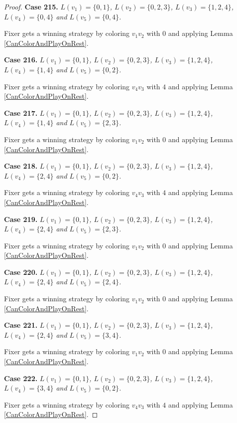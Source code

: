 \documentclass[12pt]{amsart}
\theoremstyle{plain}
\theoremstyle{definition}
\theoremstyle{remark}
\begin{document}
\begin{proof}
\noindent\textbf{Case 215.  }\textit{$L(v_1) = \{0, 1\}$, $L(v_2) = \{0, 2, 3\}$, $L(v_3) = \{1, 2, 4\}$, $L(v_4) = \{0, 4\}$ and $L(v_5) = \{0, 4\}$.}

Fixer gets a winning strategy by coloring $v_1v_2$ with $0$ and applying Lemma \ref{CanColorAndPlayOnRest}.

\noindent\textbf{Case 216.  }\textit{$L(v_1) = \{0, 1\}$, $L(v_2) = \{0, 2, 3\}$, $L(v_3) = \{1, 2, 4\}$, $L(v_4) = \{1, 4\}$ and $L(v_5) = \{0, 2\}$.}

Fixer gets a winning strategy by coloring $v_4v_3$ with $4$ and applying Lemma \ref{CanColorAndPlayOnRest}.

\noindent\textbf{Case 217.  }\textit{$L(v_1) = \{0, 1\}$, $L(v_2) = \{0, 2, 3\}$, $L(v_3) = \{1, 2, 4\}$, $L(v_4) = \{1, 4\}$ and $L(v_5) = \{2, 3\}$.}

Fixer gets a winning strategy by coloring $v_1v_2$ with $0$ and applying Lemma \ref{CanColorAndPlayOnRest}.

\noindent\textbf{Case 218.  }\textit{$L(v_1) = \{0, 1\}$, $L(v_2) = \{0, 2, 3\}$, $L(v_3) = \{1, 2, 4\}$, $L(v_4) = \{2, 4\}$ and $L(v_5) = \{0, 2\}$.}

Fixer gets a winning strategy by coloring $v_4v_3$ with $4$ and applying Lemma \ref{CanColorAndPlayOnRest}.

\noindent\textbf{Case 219.  }\textit{$L(v_1) = \{0, 1\}$, $L(v_2) = \{0, 2, 3\}$, $L(v_3) = \{1, 2, 4\}$, $L(v_4) = \{2, 4\}$ and $L(v_5) = \{2, 3\}$.}

Fixer gets a winning strategy by coloring $v_1v_2$ with $0$ and applying Lemma \ref{CanColorAndPlayOnRest}.

\noindent\textbf{Case 220.  }\textit{$L(v_1) = \{0, 1\}$, $L(v_2) = \{0, 2, 3\}$, $L(v_3) = \{1, 2, 4\}$, $L(v_4) = \{2, 4\}$ and $L(v_5) = \{2, 4\}$.}

Fixer gets a winning strategy by coloring $v_1v_2$ with $0$ and applying Lemma \ref{CanColorAndPlayOnRest}.

\noindent\textbf{Case 221.  }\textit{$L(v_1) = \{0, 1\}$, $L(v_2) = \{0, 2, 3\}$, $L(v_3) = \{1, 2, 4\}$, $L(v_4) = \{2, 4\}$ and $L(v_5) = \{3, 4\}$.}

Fixer gets a winning strategy by coloring $v_1v_2$ with $0$ and applying Lemma \ref{CanColorAndPlayOnRest}.

\noindent\textbf{Case 222.  }\textit{$L(v_1) = \{0, 1\}$, $L(v_2) = \{0, 2, 3\}$, $L(v_3) = \{1, 2, 4\}$, $L(v_4) = \{3, 4\}$ and $L(v_5) = \{0, 2\}$.}

Fixer gets a winning strategy by coloring $v_4v_3$ with $4$ and applying Lemma \ref{CanColorAndPlayOnRest}.


\end{proof}
\end{document}
